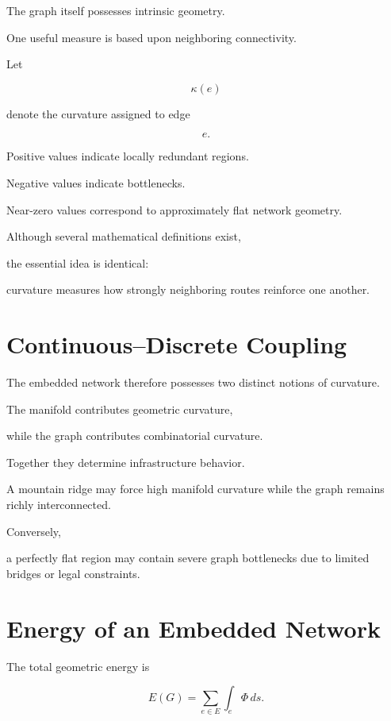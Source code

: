 \documentclass[11pt,fleqn]{book}
\numberwithin{equation}{chapter}
\theoremstyle{plain}
\theoremstyle{definition}
\theoremstyle{remark}
\begin{document}
The graph itself possesses intrinsic geometry.

One useful measure is based upon neighboring connectivity.

Let

\[
\kappa(e)
\]

denote the curvature assigned to edge

\[
e.
\]

Positive values indicate locally redundant regions.

Negative values indicate bottlenecks.

Near-zero values correspond to approximately flat network geometry.


Although several mathematical definitions exist,

the essential idea is identical:

curvature measures how strongly neighboring routes reinforce one another.


\section{Continuous--Discrete Coupling}

The embedded network therefore possesses two distinct notions of
curvature.

The manifold contributes geometric curvature,

while the graph contributes combinatorial curvature.

Together they determine infrastructure behavior.

A mountain ridge may force high manifold curvature while the graph
remains richly interconnected.

Conversely,

a perfectly flat region may contain severe graph bottlenecks due to
limited bridges or legal constraints.


\section{Energy of an Embedded Network}

The total geometric energy is

\[
\boxed{
E(G)
=
\sum_{e\in E}
\int_e
\Phi
\,ds.
}
\]
\end{document}
